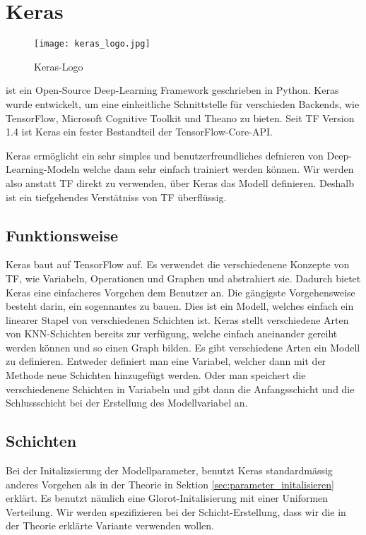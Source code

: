 \pagebreak
\section{Keras}
\begin{wrapfigure}{l}{3cm}
  \texttt{[image: keras\_logo.jpg]}
  \caption{Keras-Logo}
\end{wrapfigure}
 ist ein Open-Source Deep-Learning Framework geschrieben in
Python. Keras wurde entwickelt, um eine einheitliche Schnittstelle für
verschieden Backends, wie TensorFlow, Microsoft Cognitive Toolkit und Theano zu
bieten. Seit TF Version 1.4 ist Keras ein fester Bestandteil der TensorFlow-Core-API.

Keras ermöglicht ein sehr simples und benutzerfreundliches defnieren von
Deep-Learning-Modeln welche dann sehr einfach trainiert werden können.
Wir werden also anstatt TF direkt zu verwenden, über Keras das Modell definieren.
Deshalb ist ein tiefgehendes Verstätniss von TF überflüssig.

\subsection{Funktionsweise}
Keras baut auf TensorFlow auf. Es verwendet die verschiedenene Konzepte von TF,
wie Variabeln, Operationen und Graphen und abstrahiert sie.
Dadurch bietet Keras eine einfacheres Vorgehen dem Benutzer an.
\para{}
Die gängigste Vorgehensweise besteht darin, ein sogennantes
 zu bauen.
Dies ist ein Modell, welches einfach ein linearer Stapel von verschiedenen
Schichten ist. Keras stellt verschiedene Arten von KNN-Schichten bereits zur
verfügung, welche einfach aneinander gereiht werden können und so einen Graph bilden.
\para{}
Es gibt verschiedene Arten ein Modell zu definieren. Entweder definiert man eine
 Variabel, welcher dann mit der Methode 
neue Schichten hinzugefügt werden.
Oder man speichert die verschiedenene Schichten in Variabeln und gibt dann die
Anfangsschicht und die Schlussschicht bei der Erstellung des Modellvariabel an.

\subsection{Schichten}
Bei der Initalizsierung der Modellparameter, benutzt Keras standardmässig
anderes Vorgehen als in der Theorie in Sektion \ref{sec:parameter_initalisieren} erklärt. Es benutzt nämlich eine
Glorot-Initalisierung mit einer Uniformen Verteilung. Wir werden spezifizieren
bei der Schicht-Erstellung, dass wir die in der Theorie erklärte Variante
verwenden wollen.

